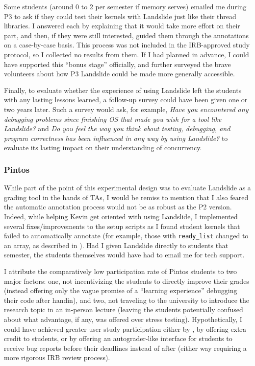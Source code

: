 Some students (around 0 to 2 per semester if memory serves)
emailed me during P3
to ask if they could test their kernels with Landslide just like their thread libraries.
I answered each by explaining that it would take more effort on their part,
and then, if they were still interested,
guided them through the annotations on a case-by-case basis.
This process was not included in the IRB-approved study protocol,
so I collected no results from them.
If I had planned in advance, I could have supported this ``bonus stage'' officially,
and further surveyed the brave volunteers about how P3 Landslide could be made more generally accessible.

Finally, to evaluate whether the experience of using Landslide
left the students with any lasting lessons learned,
a follow-up survey could have been given one or two years later.
Such a survey would ask, for example,
{\em Have you encountered any debugging problems since finishing OS that made you wish for a tool like Landslide?}
and
{\em Do you feel the way you think about testing, debugging, and program correctness
has been influenced in any way by using Landslide?}
to evaluate its lasting impact on their understanding of concurrency.

\subsubsection{Pintos}

While part of the point of this experimental design was to evaluate Landslide as a grading tool in the hands of TAs,
I would be remiss 
to mention that I also feared the automatic annotation process would not be as robust as the P2 version.
Indeed, while helping Kevin get oriented with using Landslide,
I implemented
several
fixes/improvements to the setup scripts
as I found student kernels that failed to automatically annotate
(for example, those with {\tt ready\_list} changed to an array,
as described in \sect{\ref{sec:education-pintos-instrumentation}}).
Had I given Landslide directly to students that semester,
the students themselves would have had to email me for tech support.

I attribute the comparatively low participation rate of Pintos students to two major factors:
one, not incentivizing the students to directly improve their grades
(instead offering only the vague promise of a ``learning experience'' debugging their code after handin),
and two, not traveling to the university to introduce the research topic in an in-person lecture
(leaving the students potentially confused about what advantage, if any, was offered over stress testing).
Hypothetically, I could have achieved greater user study participation
either by ,
by offering extra credit to students,
or by offering an autograder-like interface for students to receive bug reports before their deadlines instead of after
(either way requiring a more rigorous IRB review process).

